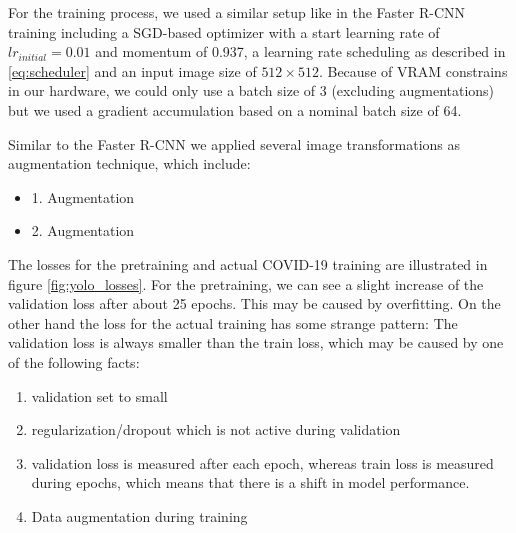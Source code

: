 For the training process, we used a similar setup like in the Faster \ac{R-CNN} training including a \ac{SGD}-based optimizer with a start learning rate of $lr_{initial} = 0.01$ and momentum of 0.937, a learning rate scheduling as described in \ref{eq:scheduler} and an input image size of $512 \times 512$. Because of VRAM constrains in our hardware, we could only use a batch size of 3 (excluding augmentations) but we used a gradient accumulation based on a nominal batch size of 64.
 
Similar to the Faster \ac{R-CNN} we applied several image transformations as augmentation technique, which include:
\begin{itemize}
	\item 1. Augmentation
	\item 2. Augmentation
\end{itemize}

The losses for the pretraining and actual COVID-19 training are illustrated in figure \ref{fig:yolo_losses}. For the pretraining, we can see a slight increase of the validation loss after about 25 epochs. This may be caused by overfitting. On the other hand the loss for the actual training has some strange pattern: The validation loss is always smaller than the train loss, which may be caused by one of the following facts:
\begin{enumerate}
	\item validation set to small
	\item regularization/dropout which is not active during validation
	\item validation loss is measured after each epoch, whereas train loss is measured during epochs, which means that there is a shift in model performance.
	\item Data augmentation during training
\end{enumerate}

